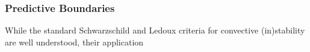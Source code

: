 {\color{brown}
\subsubsection{Predictive Boundaries}

While the standard Schwarzschild and Ledoux criteria for convective (in)stability are well understood, their application

}
